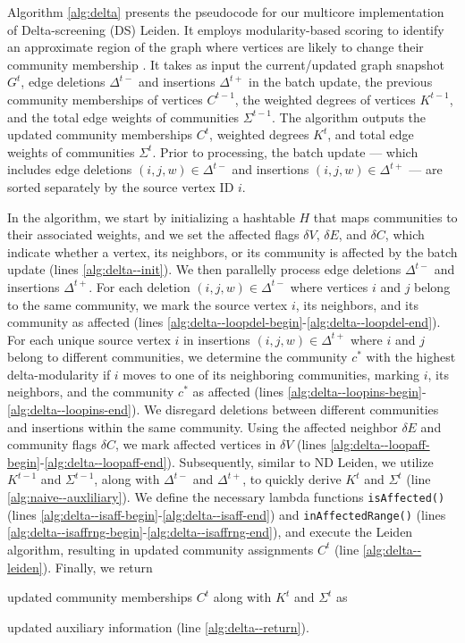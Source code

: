 Algorithm \ref{alg:delta} presents the pseudocode for our multicore implementation of Delta-screening (DS) Leiden. It employs modularity-based scoring to identify an approximate region of the graph where vertices are likely to change their community membership \cite{com-zarayeneh21}. It takes as input the current/updated graph snapshot $G^t$, edge deletions $\Delta^{t-}$ and insertions $\Delta^{t+}$ in the batch update, the previous community memberships of vertices $C^{t-1}$, the weighted degrees of vertices $K^{t-1}$, and the total edge weights of communities $\Sigma^{t-1}$. The algorithm outputs the updated community memberships $C^t$, weighted degrees $K^t$, and total edge weights of communities $\Sigma^t$. Prior to processing, the batch update --- which includes edge deletions $(i, j, w) \in \Delta^{t-}$ and insertions $(i, j, w) \in \Delta^{t+}$ --- are sorted separately by the source vertex ID $i$.

In the algorithm, we start by initializing a hashtable $H$ that maps communities to their associated weights, and we set the affected flags $\delta V$, $\delta E$, and $\delta C$, which indicate whether a vertex, its neighbors, or its community is affected by the batch update (lines \ref{alg:delta--init}). We then parallelly process edge deletions $\Delta^{t-}$ and insertions $\Delta^{t+}$. For each deletion $(i, j, w) \in \Delta^{t-}$ where vertices $i$ and $j$ belong to the same community, we mark the source vertex $i$, its neighbors, and its community as affected (lines \ref{alg:delta--loopdel-begin}-\ref{alg:delta--loopdel-end}). For each unique source vertex $i$ in insertions $(i, j, w) \in \Delta^{t+}$ where $i$ and $j$ belong to different communities, we determine the community $c^*$ with the highest delta-modularity if $i$ moves to one of its neighboring communities, marking $i$, its neighbors, and the community $c^*$ as affected (lines \ref{alg:delta--loopins-begin}-\ref{alg:delta--loopins-end}). We disregard deletions between different communities and insertions within the same community. Using the affected neighbor $\delta E$ and community flags $\delta C$, we mark affected vertices in $\delta V$ (lines \ref{alg:delta--loopaff-begin}-\ref{alg:delta--loopaff-end}). Subsequently, similar to ND Leiden, we utilize $K^{t-1}$ and $\Sigma^{t-1}$, along with $\Delta^{t-}$ and $\Delta^{t+}$, to quickly derive $K^t$ and $\Sigma^t$ (line \ref{alg:naive--auxliliary}). We define the necessary lambda functions \texttt{isAffected()} (lines \ref{alg:delta--isaff-begin}-\ref{alg:delta--isaff-end}) and \texttt{inAffectedRange()} (lines \ref{alg:delta--isaffrng-begin}-\ref{alg:delta--isaffrng-end}), and execute the Leiden algorithm, resulting in updated community assignments $C^t$ (line \ref{alg:delta--leiden}). Finally, we return updated community memberships $C^t$ along with $K^t$ and $\Sigma^t$ as updated auxiliary information (line \ref{alg:delta--return}).




